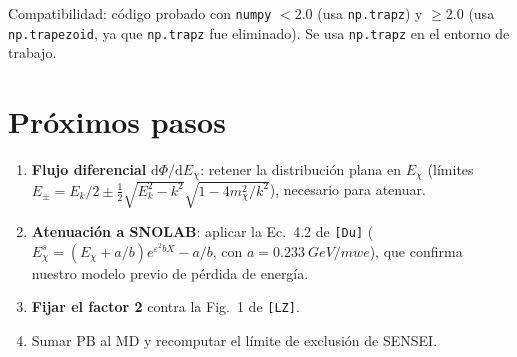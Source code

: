 \documentclass[11pt,a4paper]{article}
\newcommand{\mchi}{m_\chi}
\newcommand{\eps}{\varepsilon}
\newcommand{\Ek}{E_k}
\newcommand{\dd}{\mathrm{d}}
\newcommand{\Du}{\texttt{[Du]}}
\newcommand{\LZ}{\texttt{[LZ]}}
\begin{document}
Compatibilidad: c\'odigo probado con \texttt{numpy} $<2.0$ (usa
\texttt{np.trapz}) y $\ge2.0$ (usa \texttt{np.trapezoid}, ya que
\texttt{np.trapz} fue eliminado). Se usa \texttt{np.trapz} en el entorno de
trabajo.

\section{Pr\'oximos pasos}

\begin{enumerate}
\item \textbf{Flujo diferencial} $\dd\Phi/\dd E_\chi$: retener la distribuci\'on
plana en $E_\chi$ (l\'imites $E_\pm=\Ek/2\pm\tfrac12\sqrt{\Ek^2-k^2}\sqrt{1-4\mchi^2/k^2}$),
necesario para atenuar.
\item \textbf{Atenuaci\'on a SNOLAB}: aplicar la Ec.~4.2 de \Du{}
($E_\chi^s=(E_\chi+a/b)e^{\eps^2 bX}-a/b$, con $a=\SI{0.233}{GeV/mwe}$),
que confirma nuestro modelo previo de p\'erdida de energ\'ia.
\item \textbf{Fijar el factor 2} contra la Fig.~1 de \LZ.
\item Sumar PB al MD y recomputar el l\'imite de exclusi\'on de SENSEI.
\end{enumerate}
\end{document}

